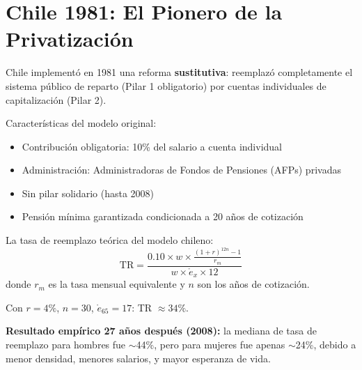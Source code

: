 \documentclass[11pt,a4paper]{report}
\begin{document}
\section{Chile 1981: El Pionero de la Privatizaci\'on}

\begin{tcolorbox}[colback=blue!5!white, colframe=blue!75!black, title=\textbf{Definici\'on Formal: Modelo Sustitutivo}, breakable]
Chile implement\'o en 1981 una reforma \textbf{sustitutiva}: reemplaz\'o completamente el sistema p\'ublico de reparto (Pilar 1 obligatorio) por cuentas individuales de capitalizaci\'on (Pilar 2).

Caracter\'isticas del modelo original:
\begin{itemize}
  \item Contribuci\'on obligatoria: 10\% del salario a cuenta individual
  \item Administraci\'on: Administradoras de Fondos de Pensiones (AFPs) privadas
  \item Sin pilar solidario (hasta 2008)
  \item Pensi\'on m\'inima garantizada condicionada a 20 a\~nos de cotizaci\'on
\end{itemize}

La tasa de reemplazo te\'orica del modelo chileno:
\[
  \text{TR} = \frac{0.10 \times w \times \frac{(1+r)^{12n} - 1}{r_m}}{w \times \mathring{e}_x \times 12}
\]
donde $r_m$ es la tasa mensual equivalente y $n$ son los a\~nos de cotizaci\'on.

Con $r = 4\%$, $n = 30$, $\mathring{e}_{65} = 17$: TR $\approx 34\%$.

\textbf{Resultado emp\'irico 27 a\~nos despu\'es (2008):} la mediana de tasa de reemplazo para hombres fue $\sim$44\%, pero para mujeres fue apenas $\sim$24\%, debido a menor densidad, menores salarios, y mayor esperanza de vida.
\end{tcolorbox}
\end{document}
